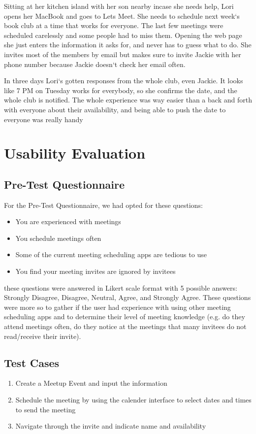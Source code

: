 \documentclass{sigchi}
\begin{document}
Sitting at her kitchen island with her son nearby incase she needs help, Lori opens her MacBook and goes to Lets Meet.
She needs to schedule next week`s book club at a time that works for everyone.
The last few meetings were scheduled carelessly and some people had to miss them.
Opening the web page she just enters the information it asks for, and never has to guess what to do.
She invites most of the members by email but makes sure to invite Jackie with her phone number because Jackie doesn`t check her email often.

In three days Lori`s gotten responses from the whole club, even Jackie.
It looks like 7 PM  on Tuesday works for everybody, so she confirms the date, and the whole club is notified.
The whole experience was way easier than a back and forth with everyone about their availability, and being able to push the date to everyone was really handy

\section{Usability Evaluation}

\subsection{Pre-Test Questionnaire}

For the Pre-Test Questionnaire, we had opted for these questions:

\begin{itemize}
	\item You are experienced with meetings
	\item You schedule meetings often
	\item Some of the current meeting scheduling apps are tedious to use
	\item You find your meeting invites are ignored by invitees	
\end{itemize}

these questions were answered in Likert scale format with 5 possible answers: Strongly Disagree, Disagree, Neutral, Agree, and Strongly Agree. These questions were more so to gather if the user had experience with using other meeting scheduling apps and to determine their level of meeting knowledge (e.g. do they attend meetings often, do they notice at the meetings that many invitees do not read/receive their invite).

\subsection{Test Cases}
\begin{enumerate}
\item Create a Meetup Event and input the information
\item Schedule the meeting by using the calender interface to select dates and times to send the meeting
\item Navigate through the invite and indicate name and availability
\end{enumerate}
\end{document}

